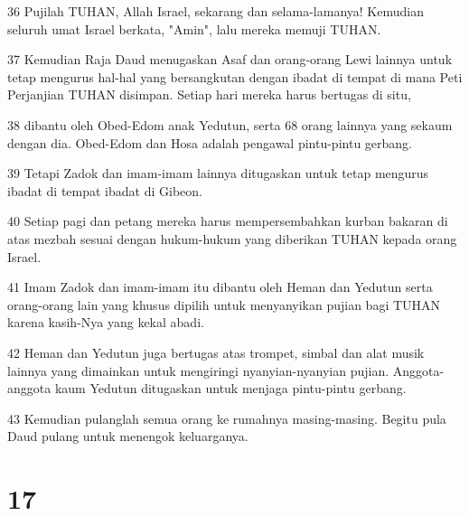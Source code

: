 \par 36 Pujilah TUHAN, Allah Israel, sekarang dan selama-lamanya! Kemudian seluruh umat Israel berkata, "Amin", lalu mereka memuji TUHAN.
\par 37 Kemudian Raja Daud menugaskan Asaf dan orang-orang Lewi lainnya untuk tetap mengurus hal-hal yang bersangkutan dengan ibadat di tempat di mana Peti Perjanjian TUHAN disimpan. Setiap hari mereka harus bertugas di situ,
\par 38 dibantu oleh Obed-Edom anak Yedutun, serta 68 orang lainnya yang sekaum dengan dia. Obed-Edom dan Hosa adalah pengawal pintu-pintu gerbang.
\par 39 Tetapi Zadok dan imam-imam lainnya ditugaskan untuk tetap mengurus ibadat di tempat ibadat di Gibeon.
\par 40 Setiap pagi dan petang mereka harus mempersembahkan kurban bakaran di atas mezbah sesuai dengan hukum-hukum yang diberikan TUHAN kepada orang Israel.
\par 41 Imam Zadok dan imam-imam itu dibantu oleh Heman dan Yedutun serta orang-orang lain yang khusus dipilih untuk menyanyikan pujian bagi TUHAN karena kasih-Nya yang kekal abadi.
\par 42 Heman dan Yedutun juga bertugas atas trompet, simbal dan alat musik lainnya yang dimainkan untuk mengiringi nyanyian-nyanyian pujian. Anggota-anggota kaum Yedutun ditugaskan untuk menjaga pintu-pintu gerbang.
\par 43 Kemudian pulanglah semua orang ke rumahnya masing-masing. Begitu pula Daud pulang untuk menengok keluarganya.

\chapter{17}

